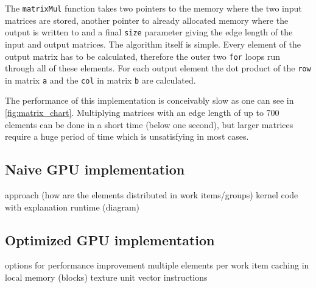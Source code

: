 

The \lstinline!matrixMul! function takes two pointers to the memory where the two input matrices are stored, another pointer to already allocated memory where the output is written to and a final \lstinline!size! parameter giving the edge length of the input and output matrices.
The algorithm itself is simple. Every element of the output matrix has to be calculated, therefore the outer two \lstinline!for! loops run through all of these elements. For each output element the dot product of the \lstinline!row! in matrix \lstinline!a! and the \lstinline!col! in matrix \lstinline!b! are calculated.

The performance of this implementation is conceivably slow as one can see in \ref{fig:matrix_chart}. Multiplying matrices with an edge length of up to 700 elements can be done in a short time (below one second), but larger matrices require a huge period of time which is unsatisfying in most cases.

\subsection{Naive GPU implementation}







approach (how are the elements distributed in work items/groups)
kernel code with explanation
runtime (diagram)

\subsection{Optimized GPU implementation}
options for performance improvement
multiple elements per work item
caching in local memory (blocks)
texture unit
vector instructions

